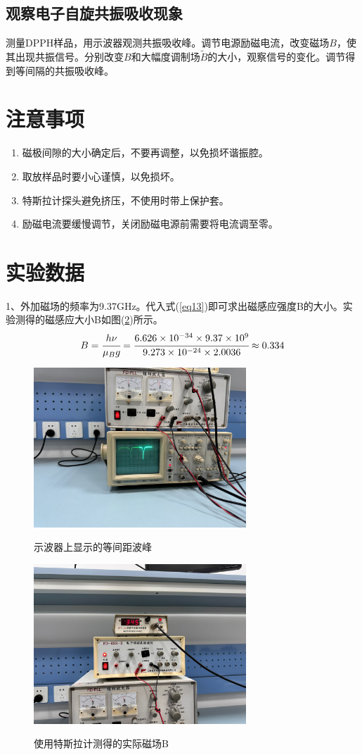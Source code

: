 \documentclass[a4paper]{article}
\begin{document}
\subsection{观察电子自旋共振吸收现象}
测量DPPH样品，用示波器观测共振吸收峰。调节电源励磁电流，改变磁场$ B $，使其出现共振信号。分别改变$ B $和大幅度调制场$\tilde{B}$的大小，观察信号的变化。调节得到等间隔的共振吸收峰。

\section{注意事项}
\begin{enumerate}
\item 磁极间隙的大小确定后，不要再调整，以免损坏谐振腔。
\item 取放样品时要小心谨慎，以免损坏。
\item 特斯拉计探头避免挤压，不使用时带上保护套。
\item 励磁电流要缓慢调节，关闭励磁电源前需要将电流调至零。
\end{enumerate}

\section{实验数据}
1、外加磁场的频率为9.37GHz。代入式(\ref{eq13})即可求出磁感应强度B的大小。实验测得的磁感应大小B如图(\ref{datafig2})所示。
\begin{equation}
B = \cfrac{h\nu}{\mu_B g} = \cfrac{6.626\times 10^{-34}\times 9.37\times 10^{9}}{9.273\times 10^{-24}\times 2.0036} \approx 0.334
\end{equation}
\begin{figure}[!h]
\centering
\includegraphics[width=8cm]{img/1.jpg}\\
\caption{示波器上显示的等间距波峰}\label{datafig1}
\end{figure}
\begin{figure}[!h]
\centering
\includegraphics[width=8cm]{img/2.jpg}\\
\caption{使用特斯拉计测得的实际磁场B}\label{datafig2}
\end{figure}
\end{document}
